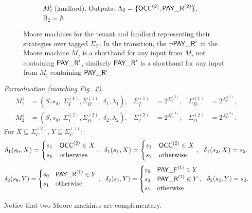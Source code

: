 \documentclass{article}
\begin{document}
\begin{example}
\begin{figure}[h]
  \begin{subfigure}[t]{0.70\textwidth}
  \centering
  \caption{$M_2^1$ (landlord). Outputs: $\mathrm{A_2}=\{\mathsf{OCC}^{(2)},\mathsf{PAY\_R}^{(2)}\}$, $\mathrm{B_2}=\emptyset$.}
  \label{fig:moore-landlord}
  \end{subfigure}
  
  \caption{Moore machines for the tenant and landlord representing their strategies over tagged $\Sigma_C$.
  In the transition, the $\lnot \mathsf{PAY\_R}^{i}$ in the Moore machine $M_j$ is a shorthand for any input from $M_i$ not containing $\mathsf{PAY\_R}^{i}$, similarly $\mathsf{PAY\_R}^{i}$ is a shorthand for any input from $M_i$ containing $\mathsf{PAY\_R}^{i}$}
  \label{fig:moore-strategies}
  \end{figure}
  
  \noindent\textit{Formalization (matching Fig.~\ref{fig:moore-strategies}).}
  \[
  \begin{aligned}
  M_1^1&=(S,s_0,\ \Sigma_I^{(1)},\Sigma_O^{(1)},\ \delta_1,\lambda_1),
  &\Sigma_I^{(1)}&=2^{\Sigma_C^{(2)}},& \Sigma_O^{(1)}&=2^{\Sigma_C^{(1)}},\\
  M_2^1&=(S,s_0,\ \Sigma_I^{(2)},\Sigma_O^{(2)},\ \delta_2,\lambda_2),
  &\Sigma_I^{(2)}&=2^{\Sigma_C^{(1)}},& \Sigma_O^{(2)}&=2^{\Sigma_C^{(2)}}.
  \end{aligned}
  \]
  For $X\subseteq\Sigma_C^{(2)}$, $Y\subseteq\Sigma_C^{(1)}$:
  \[
  \delta_1(s_0,X)=\begin{cases}s_1&\OCC^{(2)}\in X\\ s_0&\text{otherwise}\end{cases},\ \ 
  \delta_1(s_1,X)=\begin{cases}s_1&\OCC^{(2)}\in X\\ s_2&\text{otherwise}\end{cases},\ \ 
  \delta_1(s_2,X)=s_2,
  \]
  \[
  \delta_2(s_0,Y)=\begin{cases}s_0&\PAY^{(1)}\in Y\\ s_1&\text{otherwise}\end{cases},\ \ 
  \delta_2(s_1,Y)=\begin{cases}s_0&\PAYF^{(1)}\in Y\\ s_2&\PAY^{(1)}\in Y\\ s_1&\text{otherwise}\end{cases},\ \ 
  \delta_2(s_2,Y)=s_2.
  \]
  
  Notice that two Moore machines are complementary.
  \end{example}
  
\end{document}
